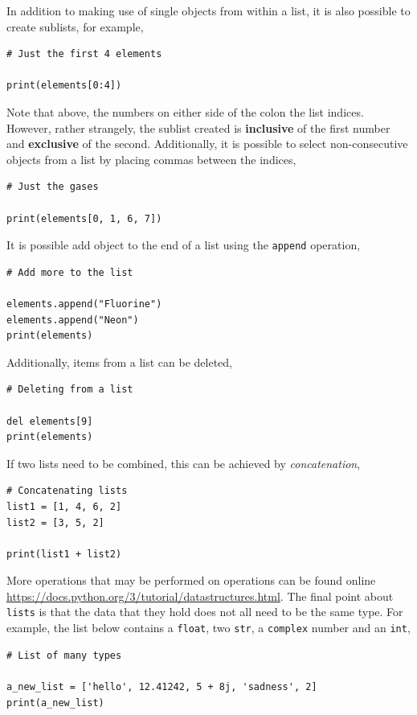 \documentclass[a4paper]{article}
\begin{document}
In addition to making use of single objects from within a list, it is also possible to create sublists, for example,
\begin{lstlisting}
# Just the first 4 elements

print(elements[0:4])
\end{lstlisting}
Note that above, the numbers on either side of the colon the list indices.
However, rather strangely, the sublist created is \textbf{inclusive} of the first number and \textbf{exclusive} of the second.
Additionally, it is possible to select non-consecutive objects from a list by placing commas between the indices,
\begin{lstlisting}
# Just the gases

print(elements[0, 1, 6, 7])
\end{lstlisting}
It is possible add object to the end of a list using the \texttt{append} operation,
\begin{lstlisting}
# Add more to the list

elements.append("Fluorine")
elements.append("Neon")
print(elements)
\end{lstlisting}
Additionally, items from a list can be deleted,
\begin{lstlisting}
# Deleting from a list

del elements[9]
print(elements)
\end{lstlisting}
If two lists need to be combined, this can be achieved by \emph{concatenation},
\begin{lstlisting}
# Concatenating lists
list1 = [1, 4, 6, 2]
list2 = [3, 5, 2]

print(list1 + list2)
\end{lstlisting}
More operations that may be performed on operations can be found online \url{https://docs.python.org/3/tutorial/datastructures.html}.
The final point about \texttt{lists} is that the data that they hold does not all need to be the same type.
For example, the list below contains a \texttt{float}, two \texttt{str}, a \texttt{complex} number and an \texttt{int},
\begin{lstlisting}
# List of many types

a_new_list = ['hello', 12.41242, 5 + 8j, 'sadness', 2]
print(a_new_list)
\end{lstlisting}
\vspace{\baselineskip}
\end{document}
